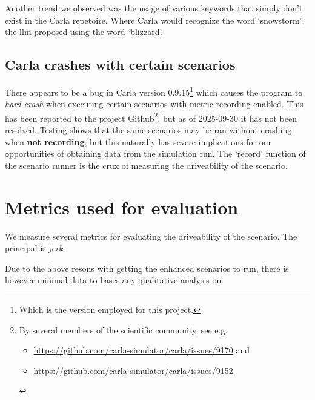Another trend we observed was the usage of various keywords that simply don't
exist in the Carla repetoire. Where Carla would recognize the word `snowstorm',
the \acrfull{llm} proposed using the word `blizzard'.


\subsection{Carla crashes with certain scenarios}

There appears to be a bug in Carla version 0.9.15\footnote{Which is the version
employed for this project.} which causes the program to \emph{hard crash} when
executing certain scenarios with metric recording enabled. This has been
reported to the project Github\footnote{By several members of the scientific community, see e.g.
\begin{itemize}\item  \url{https://github.com/carla-simulator/carla/issues/9170} and \item \url{https://github.com/carla-simulator/carla/issues/9152}\end{itemize}}, but as of 2025-09-30 it has not been resolved.
Testing shows that the same scenarios may be ran without crashing when
\textbf{not recording}, but this naturally has severe implications for our
opportunities of obtaining data from the simulation run. The `record' function
of the scenario runner is the crux of measuring the driveability of the
scenario. 


\section{Metrics used for evaluation}

We measure several metrics for evaluating the driveability of the scenario. The
principal is \emph{jerk}.

Due to the above resons with getting the enhanced scenarios to run, there is
however minimal data to bases any qualitative analysis on.